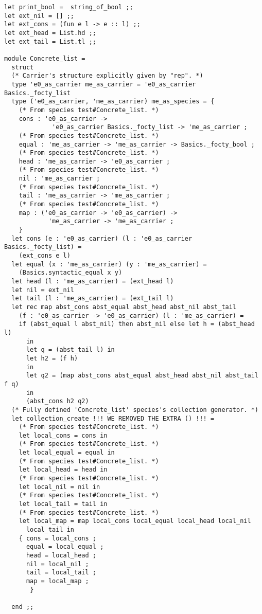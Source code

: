 {\footnotesize
\begin{lstlisting}[language=MyOCaml,
                   emph={WE, REMOVED, THE, EXTRA, ()}, emphstyle=\color{red}]
let print_bool =  string_of_bool ;;
let ext_nil = [] ;;
let ext_cons = (fun e l -> e :: l) ;;
let ext_head = List.hd ;;
let ext_tail = List.tl ;;

module Concrete_list =
  struct
  (* Carrier's structure explicitly given by "rep". *)
  type 'e0_as_carrier me_as_carrier = 'e0_as_carrier Basics._focty_list
  type ('e0_as_carrier, 'me_as_carrier) me_as_species = {
    (* From species test#Concrete_list. *)
    cons : 'e0_as_carrier ->
             'e0_as_carrier Basics._focty_list -> 'me_as_carrier ;
    (* From species test#Concrete_list. *)
    equal : 'me_as_carrier -> 'me_as_carrier -> Basics._focty_bool ;
    (* From species test#Concrete_list. *)
    head : 'me_as_carrier -> 'e0_as_carrier ;
    (* From species test#Concrete_list. *)
    nil : 'me_as_carrier ;
    (* From species test#Concrete_list. *)
    tail : 'me_as_carrier -> 'me_as_carrier ;
    (* From species test#Concrete_list. *)
    map : ('e0_as_carrier -> 'e0_as_carrier) ->
            'me_as_carrier -> 'me_as_carrier ;
    }
  let cons (e : 'e0_as_carrier) (l : 'e0_as_carrier Basics._focty_list) =
    (ext_cons e l)
  let equal (x : 'me_as_carrier) (y : 'me_as_carrier) =
    (Basics.syntactic_equal x y)
  let head (l : 'me_as_carrier) = (ext_head l)
  let nil = ext_nil
  let tail (l : 'me_as_carrier) = (ext_tail l)
  let rec map abst_cons abst_equal abst_head abst_nil abst_tail
    (f : 'e0_as_carrier -> 'e0_as_carrier) (l : 'me_as_carrier) =
    if (abst_equal l abst_nil) then abst_nil else let h = (abst_head l)
      in
      let q = (abst_tail l) in
      let h2 = (f h)
      in
      let q2 = (map abst_cons abst_equal abst_head abst_nil abst_tail f q)
      in
      (abst_cons h2 q2)
  (* Fully defined 'Concrete_list' species's collection generator. *)
  let collection_create !!! WE REMOVED THE EXTRA () !!! =
    (* From species test#Concrete_list. *)
    let local_cons = cons in
    (* From species test#Concrete_list. *)
    let local_equal = equal in
    (* From species test#Concrete_list. *)
    let local_head = head in
    (* From species test#Concrete_list. *)
    let local_nil = nil in
    (* From species test#Concrete_list. *)
    let local_tail = tail in
    (* From species test#Concrete_list. *)
    let local_map = map local_cons local_equal local_head local_nil
      local_tail in
    { cons = local_cons ;
      equal = local_equal ;
      head = local_head ;
      nil = local_nil ;
      tail = local_tail ;
      map = local_map ;
       }
    
  end ;;
\end{lstlisting}}

